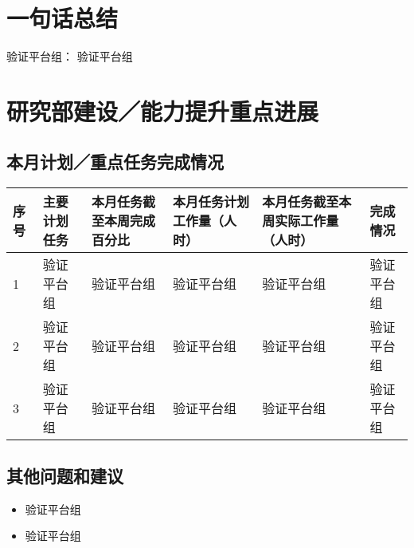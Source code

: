 \documentclass[10pt]{article} %
\begin{document}

\section{一句话总结} %
验证平台组： 验证平台组

\section{研究部建设／能力提升重点进展} %
\subsection{本月计划／重点任务完成情况} %
\begin{table}[H]
  \centering
  \begin{tabular}{p{0.5cm}|p{3cm}|p{2cm}|p{2cm}|p{2cm}|p{6cm}}
    \toprule
    序号 & 主要计划任务 & 本月任务截至本周完成百分比 & 本月任务计划工作量（人时） & 本月任务截至本周实际工作量（人时） & 完成情况 \\
    \midrule
    1 & 验证平台组 & 验证平台组 & 验证平台组 & 验证平台组 & 验证平台组 \\
    \hline
    2 & 验证平台组 & 验证平台组 & 验证平台组 & 验证平台组 & 验证平台组 \\
    \hline
    3 & 验证平台组 & 验证平台组 & 验证平台组 & 验证平台组 & 验证平台组 \\
    \bottomrule
  \end{tabular}
\end{table}
\subsection{其他问题和建议}
\begin{itemize}[noitemsep]
\item 验证平台组
\item 验证平台组
\end{itemize}
\end{document}
